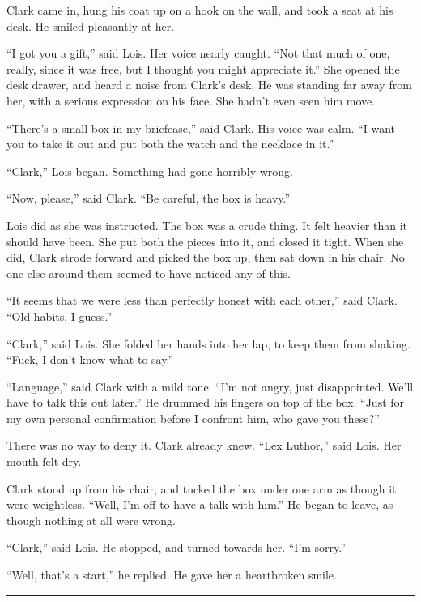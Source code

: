 \documentclass[ebook,12pt]{memoir}
\begin{document}
Clark came in, hung his coat up on a hook on the wall, and took a seat
at his desk. He smiled pleasantly at her.

``I got you a gift,'' said Lois. Her voice nearly caught. ``Not that
much of one, really, since it was free, but I thought you might
appreciate it.'' She opened the desk drawer, and heard a noise from
Clark's desk. He was standing far away from her, with a serious
expression on his face. She hadn't even seen him move.

``There's a small box in my briefcase,'' said Clark. His voice was calm.
``I want you to take it out and put both the watch and the necklace in
it.''

``Clark,'' Lois began. Something had gone horribly wrong.

``Now, please,'' said Clark. ``Be careful, the box is heavy.''

Lois did as she was instructed. The box was a crude thing. It felt
heavier than it should have been. She put both the pieces into it, and
closed it tight. When she did, Clark strode forward and picked the box
up, then sat down in his chair. No one else around them seemed to have
noticed any of this.

``It seems that we were less than perfectly honest with each other,''
said Clark. ``Old habits, I guess.''

``Clark,'' said Lois. She folded her hands into her lap, to keep them
from shaking. ``Fuck, I don't know what to say.''

``Language,'' said Clark with a mild tone. ``I'm not angry, just
disappointed. We'll have to talk this out later.'' He drummed his
fingers on top of the box. ``Just for my own personal confirmation
before I confront him, who gave you these?''

There was no way to deny it. Clark already knew. ``Lex Luthor,'' said
Lois. Her mouth felt dry.

Clark stood up from his chair, and tucked the box under one arm as
though it were weightless. ``Well, I'm off to have a talk with him.'' He
began to leave, as though nothing at all were wrong.

``Clark,'' said Lois. He stopped, and turned towards her. ``I'm sorry.''

``Well, that's a start,'' he replied. He gave her a heartbroken smile.

\begin{center}\rule{0.5\linewidth}{\linethickness}\end{center}
\end{document}
